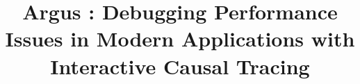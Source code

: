 \documentclass[pageno]{jpaper}
\newcommand{\mytitle}[0]{\textbf {Argus : Debugging Performance Issues in Modern Applications with Interactive Causal Tracing}}
\begin{document}
\title{\mytitle}

\date{}
\maketitle

\thispagestyle{empty}
\begin{abstract}

\end{abstract}













\end{document}
